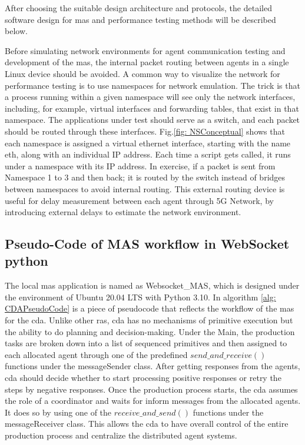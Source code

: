 After choosing the suitable design architecture and protocols, the detailed 
software design for \gls{mas} and performance testing methods will be described below. 

Before simulating network environments for agent communication testing 
and development of the \gls{mas}, the internal packet routing between agents 
in a single Linux device should be avoided. A common way to visualize 
the network for performance testing is to use namespaces for network 
emulation. The trick is that a process running within a given
namespace will see only the network interfaces, including, for example, 
virtual interfaces and forwarding tables, that exist in that namespace. 
The applications under test should serve as a
switch, and each packet should be routed through these interfaces. 
Fig.\ref{fig: NSConceptual} shows that each namespace is assigned 
a virtual ethernet interface, 
starting with the name eth, along with an individual IP address. 
Each time a script gets called, it runs under a namespace with its 
IP address. In exercise, if a packet is sent from
Namespace 1 to 3 and then back; it is routed by the switch instead of 
bridges between namespaces to avoid internal routing. This external routing 
device is useful for delay measurement between each agent through 5G Network, 
by introducing external delays to estimate the network environment. 


\subsection{Pseudo-Code of MAS workflow in WebSocket python}\label{chap: Meth-WS-MAS}
The local \gls{mas} application is named as Websocket\_MAS, which is designed under the 
environment of Ubuntu 20.04 LTS with Python 3.10. 
In algorithm \ref{alg: CDAPseudoCode} is a piece of pseudocode that reflects the workflow of the \gls{mas} for the \gls{cda}. 
Unlike other \gls{ras}, \gls{cda} has no mechanisms of primitive execution but the ability to do planning and decision-making. 
Under the Main, the production tasks are broken down into a list of sequenced primitives and then assigned to each allocated agent through one of the predefined $send\_and\_receive()$ functions under the messageSender class.
After getting responses from the agents, \gls{cda} should decide whether to start processing positive responses or retry the steps by negative responses.  
Once the production process starts, the \gls{cda} assumes the role of a coordinator and waits for inform messages from the allocated agents. It does so by using one of the $receive\_and\_send()$ functions under the messageReceiver class. This allows the \gls{cda} to have overall control of the entire production process and centralize the distributed agent systems.


